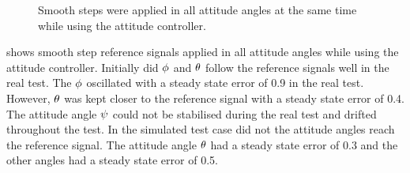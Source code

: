 \begin{figure}
\centering
  \qquad
  \qquad
  \qquad
  \qquad
  \qquad
  \caption{\label{fig:StepAllAttitude}%
  Smooth steps were applied in all attitude angles at the same time while using the attitude controller.}
\end{figure}

 shows smooth step reference signals applied in all attitude angles while using the attitude controller. Initially did $\phi$ and $\theta$ follow the reference signals well in the real test. The $\phi$ oscillated with a steady state error of 0.9 in the real test. However, $\theta$ was kept closer to the reference signal with a steady state error of 0.4. The attitude angle $\psi$ could not be stabilised during the real test and drifted throughout the test. In the simulated test case did not the attitude angles reach the reference signal. The attitude angle $\theta$ had a steady state error of 0.3 and the other angles had a steady state error of 0.5.

